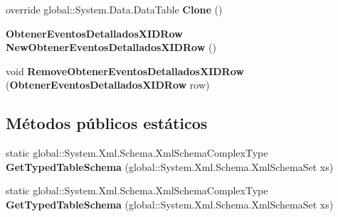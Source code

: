 \begin{DoxyCompactItemize}
\item 
override global\+::\+System.\+Data.\+Data\+Table {\bfseries Clone} ()\label{class_resa___pro_1_1_resa_d_b_data_set_1_1_obtener_eventos_detallados_x_i_d_data_table_a0e88346b627efca7c5f41fcd22423202}

\item 
{\bf Obtener\+Eventos\+Detallados\+X\+I\+D\+Row} {\bfseries New\+Obtener\+Eventos\+Detallados\+X\+I\+D\+Row} ()\label{class_resa___pro_1_1_resa_d_b_data_set_1_1_obtener_eventos_detallados_x_i_d_data_table_a40e78f960eaa2a4d49b729eb63c07aa7}

\item 
void {\bfseries Remove\+Obtener\+Eventos\+Detallados\+X\+I\+D\+Row} ({\bf Obtener\+Eventos\+Detallados\+X\+I\+D\+Row} row)\label{class_resa___pro_1_1_resa_d_b_data_set_1_1_obtener_eventos_detallados_x_i_d_data_table_a0cb3fe6cbf2bbf15b9f4881be08cb83c}

\end{DoxyCompactItemize}
\subsection*{Métodos públicos estáticos}
\begin{DoxyCompactItemize}
\item 
static global\+::\+System.\+Xml.\+Schema.\+Xml\+Schema\+Complex\+Type {\bfseries Get\+Typed\+Table\+Schema} (global\+::\+System.\+Xml.\+Schema.\+Xml\+Schema\+Set xs)\label{class_resa___pro_1_1_resa_d_b_data_set_1_1_obtener_eventos_detallados_x_i_d_data_table_ab0dbbabd10e15669ea842127569ef96b}

\item 
static global\+::\+System.\+Xml.\+Schema.\+Xml\+Schema\+Complex\+Type {\bfseries Get\+Typed\+Table\+Schema} (global\+::\+System.\+Xml.\+Schema.\+Xml\+Schema\+Set xs)\label{class_resa___pro_1_1_resa_d_b_data_set_1_1_obtener_eventos_detallados_x_i_d_data_table_ab0dbbabd10e15669ea842127569ef96b}

\end{DoxyCompactItemize}
